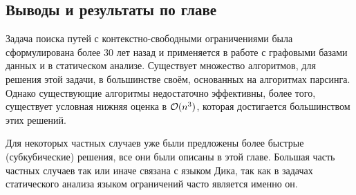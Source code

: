 \subsection{Выводы и результаты по главе}

Задача поиска путей с контекстно-свободными ограничениями была сформулирована более 30 лет назад и применяется в работе с графовыми базами данных и в статическом анализе. Существует множество алгоритмов, для решения этой задачи, в большинстве своём, основанных на алгоритмах парсинга. Однако существующие алгоритмы недостаточно эффективны, более того, существует условная нижняя оценка в $\mathcal{O}(n^3)$, которая достигается большинством этих решений.

Для некоторых частных случаев уже были предложены более быстрые (субкубические) решения, все они были описаны в этой главе. Большая часть частных случаев так или иначе связана с языком Дика, так как в задачах статического анализа языком ограничений часто является именно он.

